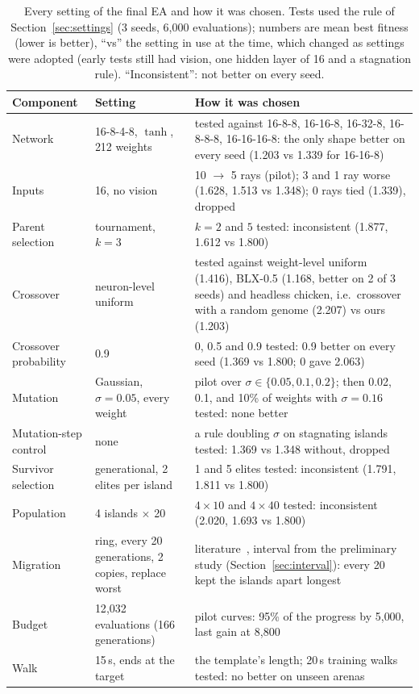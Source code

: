 \documentclass[sigconf]{acmart}
\begin{document}
\begin{table}[t]
  \caption{Every setting of the final EA and how it was chosen. Tests used
  the rule of Section~\ref{sec:settings} (3 seeds, 6{,}000 evaluations);
  numbers are mean best fitness (lower is better), ``vs'' the setting in use
  at the time, which changed as settings were adopted (early tests still had
  vision, one hidden layer of 16 and a stagnation rule). ``Inconsistent'':
  not better on every seed.}
  \label{tab:params}
  \small
  \begin{tabularx}{\textwidth}{@{}p{2.6cm}p{4.3cm}X@{}}
    \toprule
    Component & Setting & How it was chosen \\
    \midrule
    Network & 16-8-4-8, $\tanh$, 212 weights & tested against 16-8-8, 16-16-8, 16-32-8, 16-8-8-8, 16-16-16-8: the only shape better on every seed (1.203 vs 1.339 for 16-16-8) \\
    Inputs & 16, no vision & 10 $\to$ 5 rays (pilot); 3 and 1 ray worse (1.628, 1.513 vs 1.348); 0 rays tied (1.339), dropped \\
    Parent selection & tournament, $k = 3$ & $k = 2$ and $5$ tested: inconsistent (1.877, 1.612 vs 1.800) \\
    Crossover & neuron-level uniform & tested against weight-level uniform (1.416), BLX-0.5 (1.168, better on 2 of 3 seeds) and headless chicken, i.e.\ crossover with a random genome (2.207) vs ours (1.203) \\
    Crossover probability & 0.9 & 0, 0.5 and 0.9 tested: 0.9 better on every seed (1.369 vs 1.800; 0 gave 2.063) \\
    Mutation & Gaussian, $\sigma = 0.05$, every weight & pilot over $\sigma \in \{0.05, 0.1, 0.2\}$; then 0.02, 0.1, and 10\% of weights with $\sigma = 0.16$ tested: none better \\
    Mutation-step control & none & a rule doubling $\sigma$ on stagnating islands tested: 1.369 vs 1.348 without, dropped \\
    Survivor selection & generational, 2 elites per island & 1 and 5 elites tested: inconsistent (1.791, 1.811 vs 1.800) \\
    Population & 4 islands $\times$ 20 & $4 \times 10$ and $4 \times 40$ tested: inconsistent (2.020, 1.693 vs 1.800) \\
    Migration & ring, every 20 generations, 2 copies, replace worst & literature~\cite{cantupaz2001migration}, interval from the preliminary study (Section~\ref{sec:interval}): every 20 kept the islands apart longest \\
    Budget & 12{,}032 evaluations (166 generations) & pilot curves: 95\% of the progress by 5{,}000, last gain at 8{,}800 \\

    Walk & 15\,s, ends at the target & the template's length; 20\,s training walks tested: no better on unseen arenas \\
    \bottomrule
  \end{tabularx}
\end{table}
\end{document}
